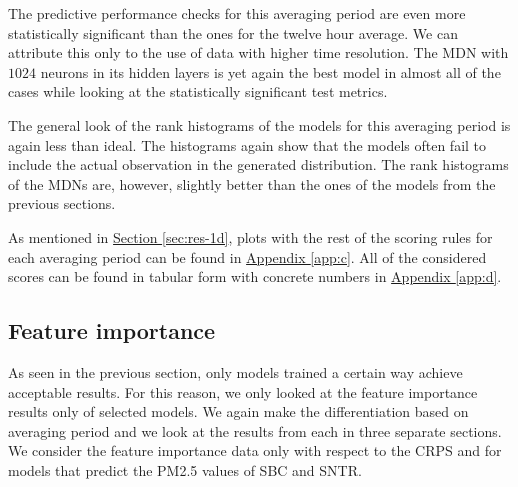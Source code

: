\documentclass[12pt,a4paper,twoside]{scrartcl}
\numberwithin{equation}{section}
\newcommand{\refsec}[1]{\hyperref[#1]{Section \ref*{#1}}}
\newcommand{\refapp}[1]{\hyperref[#1]{Appendix \ref*{#1}}}
\begin{document}
The predictive performance checks for this averaging period are even more statistically significant than the ones for the twelve hour average. We can attribute this only to the use of data with higher time resolution. The MDN with \(1024\) neurons in its hidden layers is yet again the best model in almost all of the cases while looking at the statistically significant test metrics.

The general look of the rank histograms of the models for this averaging period is again less than ideal. The histograms again show that the models often fail to include the actual observation in the generated distribution. The rank histograms of the MDNs are, however, slightly better than the ones of the models from the previous sections.

As mentioned in \refsec{sec:res-1d}, plots with the rest of the scoring rules for each averaging period can be found in \refapp{app:c}. All of the considered scores can be found in tabular form with concrete numbers in \refapp{app:d}.
\subsection{Feature importance}\label{sec:model-feature-imp}
As seen in the previous section, only models trained a certain way achieve acceptable results. For this reason, we only looked at the feature importance results only of selected models. We again make the differentiation based on averaging period and we look at the results from each in three separate sections. We consider the feature importance data only with respect to the CRPS and for models that predict the PM2.5 values of SBC and SNTR.
\vfill
\end{document}
